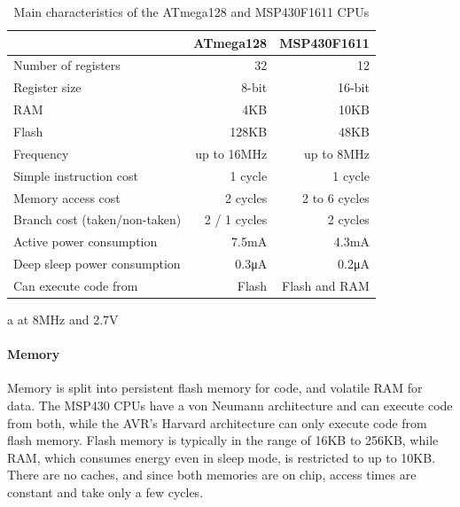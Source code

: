 \begin{table}
\caption{Main characteristics of the ATmega128 and MSP430F1611 CPUs}
\label{tbl-ATmega128-msp430f1611}
    \begin{threeparttable}
    \begin{tabular}{lrr}
    \toprule
                                           & ATmega128 \cite{Atmel:ATmega128Datasheet, Atmel:AVRInstructionSetManual}   & MSP430F1611 \cite{TexasInstrumentsIncorporated:MSP430F1611Datasheet, TexasInstrumentsIncorporated:MSP430x1xxUsersGuide} \\
    \midrule
    \midrule
    Number of registers                    & 32           & 12            \\
    Register size                          & 8-bit        & 16-bit        \\
    RAM                                    & 4KB          & 10KB          \\
    Flash                                  & 128KB        & 48KB          \\
    Frequency                              & up to 16MHz  & up to 8MHz    \\
    Simple instruction cost                & 1 cycle      & 1 cycle       \\
    Memory access cost                     & 2 cycles     & 2 to 6 cycles \\
    Branch cost (taken/non-taken)          & 2 / 1 cycles & 2 cycles      \\
    Active power consumption\tnote{a}      & 7.5mA        & 4.3mA         \\ %
    Deep sleep power consumption           & 0.3μA        & 0.2μA         \\
    Can execute code from                  & Flash        & Flash and RAM \\
    \bottomrule
    \end{tabular}
    \begin{tablenotes}
        \item[a] at 8MHz and 2.7V
    \end{tablenotes}
    \end{threeparttable}
\end{table}

\paragraph{Memory}
Memory is split into persistent flash memory for code, and volatile RAM for data. The MSP430 CPUs have a von Neumann architecture and can execute code from both, while the AVR's Harvard architecture can only execute code from flash memory. Flash memory is typically in the range of 16KB to 256KB, while RAM, which consumes energy even in sleep mode, is restricted to up to 10KB. There are no caches, and since both memories are on chip, access times are constant and take only a few cycles.

